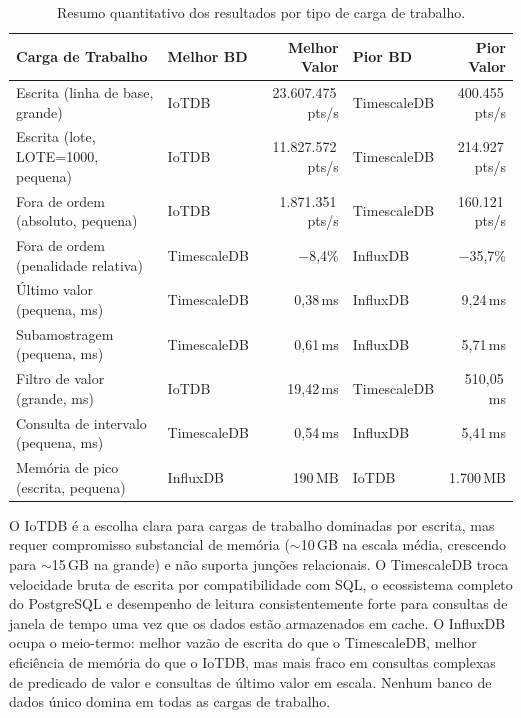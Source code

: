 \begin{table}[t]
  \centering
  \caption{Resumo quantitativo dos resultados por tipo de carga de trabalho.}
  \label{tab:quantitative_summary}
  \footnotesize
  \begin{tabular}{l l r l r}
    \hline
    \textbf{Carga de Trabalho} & \textbf{Melhor BD} & \textbf{Melhor Valor} & \textbf{Pior BD} & \textbf{Pior Valor} \\
    \hline
    Escrita (linha de base, grande)       & IoTDB       & 23.607.475\,pts/s & TimescaleDB &    400.455\,pts/s \\
    Escrita (lote, LOTE=1000, pequena)    & IoTDB       & 11.827.572\,pts/s & TimescaleDB &    214.927\,pts/s \\
    Fora de ordem (absoluto, pequena)     & IoTDB       &  1.871.351\,pts/s & TimescaleDB &    160.121\,pts/s \\
    Fora de ordem (penalidade relativa)   & TimescaleDB &            $-$8,4\% & InfluxDB   &           $-$35,7\% \\
    Último valor (pequena, ms)            & TimescaleDB &           0,38\,ms & InfluxDB   &            9,24\,ms \\
    Subamostragem (pequena, ms)           & TimescaleDB &           0,61\,ms & InfluxDB   &            5,71\,ms \\
    Filtro de valor (grande, ms)          & IoTDB       &          19,42\,ms & TimescaleDB&          510,05\,ms \\
    Consulta de intervalo (pequena, ms)   & TimescaleDB &           0,54\,ms & InfluxDB   &            5,41\,ms \\
    Memória de pico (escrita, pequena)    & InfluxDB    &          190\,MB   & IoTDB      &          1.700\,MB  \\
    \hline
  \end{tabular}
\end{table}

O IoTDB é a escolha clara para cargas de trabalho dominadas por escrita, mas requer compromisso
substancial de memória ($\sim$10\,GB na escala média, crescendo para $\sim$15\,GB na grande)
e não suporta junções relacionais. O TimescaleDB troca velocidade bruta de escrita por
compatibilidade com SQL, o ecossistema completo do PostgreSQL e desempenho de leitura
consistentemente forte para consultas de janela de tempo uma vez que os dados estão
armazenados em cache. O InfluxDB ocupa o meio-termo: melhor vazão de escrita do que o
TimescaleDB, melhor eficiência de memória do que o IoTDB, mas mais fraco em consultas
complexas de predicado de valor e consultas de último valor em escala. Nenhum banco de dados
único domina em todas as cargas de trabalho.
